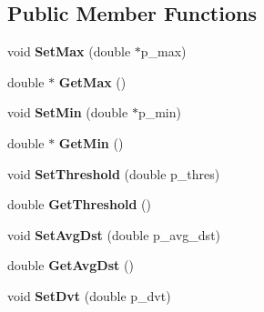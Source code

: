 \subsection*{Public Member Functions}
\begin{DoxyCompactItemize}
\item 
\hypertarget{classns3_1_1EuclideanModel_a72e849788955f7b5484f5cfa9ef4497a}{}void {\bfseries Set\+Max} (double $\ast$p\+\_\+max)\label{classns3_1_1EuclideanModel_a72e849788955f7b5484f5cfa9ef4497a}

\item 
\hypertarget{classns3_1_1EuclideanModel_af5f268b4b3f7cde05922f5c710b74c2e}{}double $\ast$ {\bfseries Get\+Max} ()\label{classns3_1_1EuclideanModel_af5f268b4b3f7cde05922f5c710b74c2e}

\item 
\hypertarget{classns3_1_1EuclideanModel_ab1775f1b41065e12cebae7be5d3ee6c6}{}void {\bfseries Set\+Min} (double $\ast$p\+\_\+min)\label{classns3_1_1EuclideanModel_ab1775f1b41065e12cebae7be5d3ee6c6}

\item 
\hypertarget{classns3_1_1EuclideanModel_a707601f73adfbca9d715f660bbe54178}{}double $\ast$ {\bfseries Get\+Min} ()\label{classns3_1_1EuclideanModel_a707601f73adfbca9d715f660bbe54178}

\item 
\hypertarget{classns3_1_1EuclideanModel_a6329af4586842fd336e7eafa14ea035b}{}void {\bfseries Set\+Threshold} (double p\+\_\+thres)\label{classns3_1_1EuclideanModel_a6329af4586842fd336e7eafa14ea035b}

\item 
\hypertarget{classns3_1_1EuclideanModel_a71b8f11d69d28af1afdfc9be756bfc82}{}double {\bfseries Get\+Threshold} ()\label{classns3_1_1EuclideanModel_a71b8f11d69d28af1afdfc9be756bfc82}

\item 
\hypertarget{classns3_1_1EuclideanModel_a47fcddbce3134e6569bc3fe37ccbbcef}{}void {\bfseries Set\+Avg\+Dst} (double p\+\_\+avg\+\_\+dst)\label{classns3_1_1EuclideanModel_a47fcddbce3134e6569bc3fe37ccbbcef}

\item 
\hypertarget{classns3_1_1EuclideanModel_a9bc1260f1e862052d6e40dd7ac08118b}{}double {\bfseries Get\+Avg\+Dst} ()\label{classns3_1_1EuclideanModel_a9bc1260f1e862052d6e40dd7ac08118b}

\item 
\hypertarget{classns3_1_1EuclideanModel_ac0192feab87741fdda6e24981a50b7f9}{}void {\bfseries Set\+Dvt} (double p\+\_\+dvt)\label{classns3_1_1EuclideanModel_ac0192feab87741fdda6e24981a50b7f9}


\end{DoxyCompactItemize}
